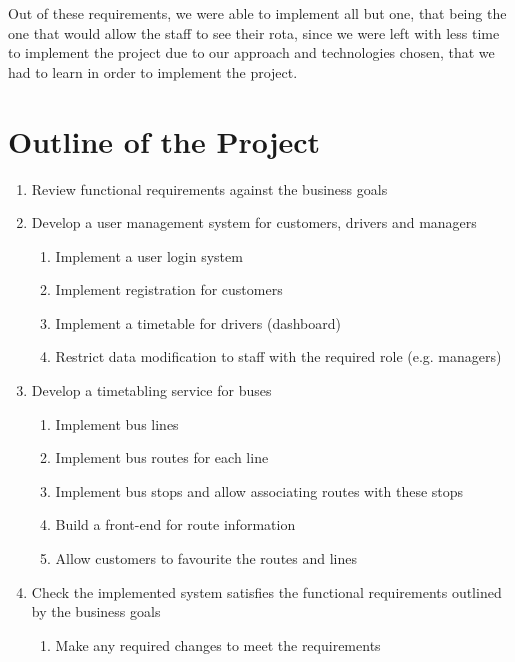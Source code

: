 Out of these requirements, we were able to implement all but one, that being the one that would allow the staff to see their rota, since we were left with less time to implement the project due to our approach and technologies chosen, that we had to learn in order to implement the project.

\clearpage
\section{Outline of the Project}

\begin{enumerate}
  \item Review functional requirements against the business goals
  \item Develop a user management system for customers, drivers and managers
  \begin{enumerate}
    \item Implement a user login system
    \item Implement registration for customers
    \item Implement a timetable for drivers (dashboard)
    \item Restrict data modification to staff with the required role (e.g. managers)
  \end{enumerate}
  \item Develop a timetabling service for buses
  \begin{enumerate}
    \item Implement bus lines
    \item Implement bus routes for each line
    \item Implement bus stops and allow associating routes with these stops
    \item Build a front-end for route information
    \item Allow customers to favourite the routes and lines
  \end{enumerate}
  \item Check the implemented system satisfies the functional
  requirements outlined by the business goals
  \begin{enumerate}
    \item Make any required changes to meet the requirements
  \end{enumerate}
\end{enumerate}

